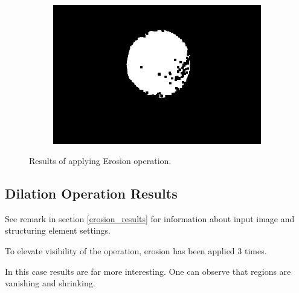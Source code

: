 \documentclass{article}
\begin{document}
\begin{figure}[H]
\begin{subfigure}{.09\textwidth}
  \label{fig:arrow}
\end{subfigure}%
\begin{subfigure}{.37\textwidth}
  \centering
  \includegraphics[width=0.97\linewidth]{_Figures/raw_data_4_erosion.png}
  \caption{}
  \label{fig:raw_4_erosion}
\end{subfigure}

\caption{Results of applying Erosion operation. }
\label{fig:erosion_results}
\end{figure}

%
%
\newpage
\subsection{Dilation Operation Results}
See remark in section \ref{erosion_results} for information about input image and structuring element settings.
 
To elevate visibility of the operation, erosion has been applied 3 times.

In this case results are far more interesting. One can observe that regions are vanishing and shrinking.
\end{document}
